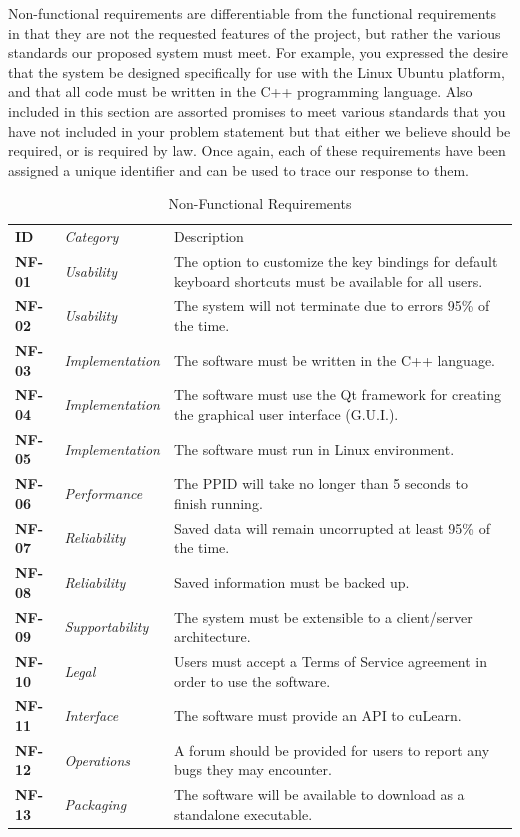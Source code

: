\documentclass[12pt,letterpaper]{article}
\begin{document}
Non-functional requirements are differentiable from the functional requirements in that they are not the requested features of the project, but
rather the various standards our proposed system must meet. For example, you expressed the desire that the system be designed specifically 
for use with the Linux Ubuntu platform, and that all code must be written in the C++ programming language. Also included in this section are
assorted promises to meet various standards that you have not included in your problem statement but that either we believe should be required, 
or is required by law. Once again, each of these requirements have been assigned a unique identifier and can be used to trace our response to them.

\begin{table}[H]
	\caption{Non-Functional Requirements}
	\vspace{1em}
	\begin{tabu} to 
	    \tableheader{}ID & Category & Description\\
		NF-01 & Usability & The option to customize the key bindings for default keyboard shortcuts must be available for all users.\\
		NF-02 & Usability & The system will not terminate due to errors 95\% of the time.\\
		NF-03 & Implementation & The software must be written in the C++ language. \\
		NF-04 & Implementation & The software must use the Qt framework for creating the graphical user interface (G.U.I.). \\
		NF-05 & Implementation & The software must run in Linux environment. \\
		NF-06 & Performance & The PPID will take no longer than 5 seconds to finish running. \\
		NF-07 & Reliability & Saved data will remain uncorrupted at least 95\% of the time. \\
		NF-08 & Reliability & Saved information must be backed up. \\
		NF-09 & Supportability & The system must be extensible to a client/server architecture. \\
		NF-10 & Legal & Users must accept a Terms of Service agreement in order to use the software.\\
		NF-11 & Interface & The software must provide an API to cuLearn.\\
		NF-12 & Operations & A forum should be provided for users to report any bugs they may encounter. \\
		NF-13 & Packaging & The software will be available to download as a standalone executable. \\
	\end{tabu}
\end{table}
\end{document}
